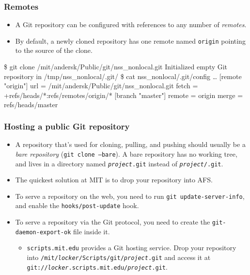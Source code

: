 \documentclass{beamer}
\makeatletter
\newcommand{\sh}[1]{\$ {\color{beamer@blendedblue}#1}}
\makeatother
\begin{document}
\begin{frame}[fragile]
  \frametitle{Remotes}
  \begin{itemize}
  \item A Git repository can be configured with references to any
    number of \emph{remotes}.
  \item By default, a newly cloned repository has one remote named
    \texttt{origin} pointing to the source of the clone.
  \end{itemize}
  \begin{footnotesize}
\begin{semiverbatim}
\sh{git clone /mit/andersk/Public/git/nss_nonlocal.git}
Initialized empty Git repository in /tmp/nss_nonlocal/.git/
\sh{cat nss_nonlocal/.git/config}
\dots
[remote "origin"]
	url = /mit/andersk/Public/git/nss_nonlocal.git
	fetch = +refs/heads/*:refs/remotes/origin/*
[branch "master"]
	remote = origin
	merge = refs/heads/master
\end{semiverbatim}
  \end{footnotesize}
\end{frame}

\begin{frame}
  \frametitle{Hosting a public Git repository}

  \begin{itemize}
  \item A repository that's used for cloning, pulling, and pushing
    should usually be a \emph{bare repository} (\texttt{git clone
      --bare}).  A bare repository has no working tree, and lives in a
    directory named \texttt{\textit{project}.git} instead of
    \texttt{\textit{project}/.git}.
  \item The quickest solution at MIT is to drop your repository into
    AFS.
  \item To serve a repository on the web, you need to run \texttt{git
      update-server-info}, and enable the \texttt{hooks/post-update}
    hook.
  \item To serve a repository via the Git protocol, you need to create
    the \texttt{git-daemon-export-ok} file inside it.
    \begin{itemize}
    \item \texttt{scripts.mit.edu} provides a Git hosting service.
      Drop your repository into
      \texttt{/mit/\textit{locker}/Scripts/git/\textit{project}.git}
      and access it at
      \texttt{git://\textit{locker}.scripts.mit.edu/\textit{project}.git}.
    \end{itemize}
  \end{itemize}
\end{frame}
\end{document}
